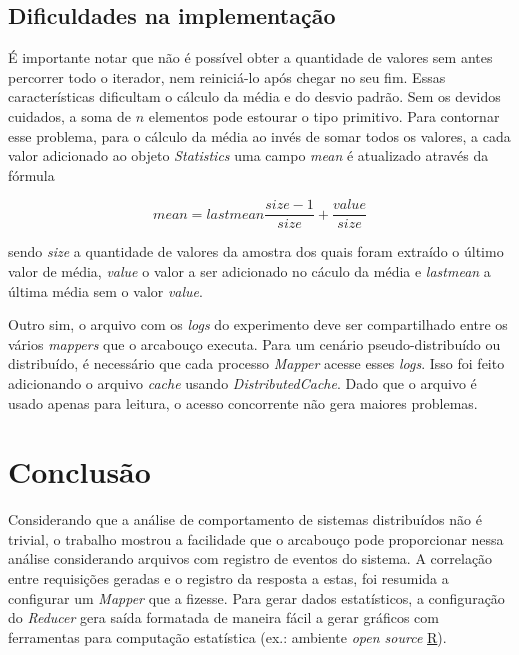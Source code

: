 \documentclass[brazil, a4paper,12pt]{article}
\begin{document}
\subsection {Dificuldades na implementação}

É importante notar que não é possível obter a quantidade de valores sem antes percorrer todo o iterador, nem reiniciá-lo após chegar no seu fim. Essas características dificultam o cálculo da média e do desvio padrão. Sem os devidos cuidados, a soma de $n$ elementos pode estourar o tipo primitivo. Para contornar esse problema, para o cálculo da média ao invés de somar todos os valores, a cada valor adicionado ao objeto \emph{Statistics} uma campo \emph{mean} é atualizado através da fórmula

\[
mean = lastmean \frac{size-1}{size} + \frac{value}{size}
\]

\noindent sendo \emph{size} a quantidade de valores da amostra dos quais foram extraído o último valor de média, \emph{value} o valor a ser adicionado no cáculo da média e \emph{lastmean} a última média sem o valor \emph{value}.

Outro sim, o arquivo com os \emph{logs} do experimento deve ser compartilhado entre os vários \emph{mappers} que o arcabouço executa. Para um cenário pseudo-distribuído ou distribuído, é necessário que cada processo \emph{Mapper} acesse esses \emph{logs}. Isso foi feito adicionando o arquivo \emph{cache} usando \emph{DistributedCache}. Dado que o arquivo é usado apenas para leitura, o acesso concorrente não gera maiores problemas.

\section {Conclusão}

Considerando que a análise de comportamento de sistemas distribuídos não é trivial, o trabalho mostrou a facilidade que o arcabouço pode proporcionar nessa análise considerando arquivos com registro de eventos do sistema. A correlação entre requisições geradas e o registro da resposta a estas, foi resumida a configurar um \emph{Mapper} que a fizesse. Para gerar dados estatísticos, a configuração do \emph{Reducer} gera saída formatada de maneira fácil a gerar gráficos com ferramentas para computação estatística (ex.: ambiente \textit{open source} \href{http://www.r-project.org/}{R}).
\end{document}

